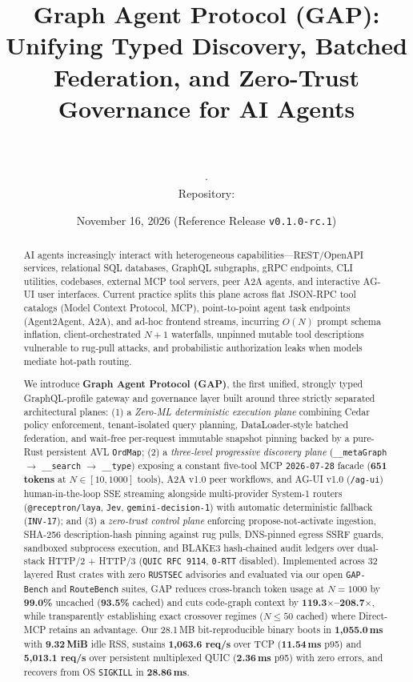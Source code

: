 \documentclass[10pt,twocolumn]{article}
\title{\Large\bfseries Graph Agent Protocol (GAP): Unifying Typed Discovery, Batched Federation, and Zero-Trust Governance for AI Agents}
\author{
  {\fontencoding{T5}\selectfont \GapAuthorFullName} \\
  \small \GapAuthorAffiliation \\
  \small \texttt{\GapAuthorEmail} \quad $\cdot$ \quad {\scriptsize \href{\GapAuthorOrcid}{\texttt{\GapAuthorOrcid}}} \\
  \small Repository: \href{\GapRepoUrl}{\texttt{\GapRepoUrl}}
}
\date{November 16, 2026 \quad (Reference Release \texttt{v0.1.0-rc.1})}
\begin{document}
\maketitle

\begin{abstract}
AI agents increasingly interact with heterogeneous capabilities—REST/OpenAPI services, relational SQL databases, GraphQL subgraphs, gRPC endpoints, CLI utilities, codebases, external MCP tool servers, peer A2A agents, and interactive AG-UI user interfaces. Current practice splits this plane across flat JSON-RPC tool catalogs (Model Context Protocol, MCP), point-to-point agent task endpoints (Agent2Agent, A2A), and ad-hoc frontend streams, incurring $O(N)$ prompt schema inflation, client-orchestrated $N+1$ waterfalls, unpinned mutable tool descriptions vulnerable to rug-pull attacks, and probabilistic authorization leaks when models mediate hot-path routing.

We introduce \textbf{Graph Agent Protocol (GAP)}, the first unified, strongly typed GraphQL-profile gateway and governance layer built around three strictly separated architectural planes: (1) a \emph{Zero-ML deterministic execution plane} combining Cedar policy enforcement, tenant-isolated query planning, DataLoader-style batched federation, and wait-free per-request immutable snapshot pinning backed by a pure-Rust persistent AVL \texttt{OrdMap}; (2) a \emph{three-level progressive discovery plane} (\texttt{\_\_metaGraph} $\rightarrow$ \texttt{\_\_search} $\rightarrow$ \texttt{\_\_type}) exposing a constant five-tool MCP \texttt{2026-07-28} facade (\textbf{651 tokens} at $N \in [10, 1000]$ tools), A2A v1.0 peer workflows, and AG-UI v1.0 (\texttt{/ag-ui}) human-in-the-loop SSE streaming alongside multi-provider System-1 routers (\texttt{@receptron/laya}, \texttt{Jev}, \texttt{gemini-decision-1}) with automatic deterministic fallback (\texttt{INV-17}); and (3) a \emph{zero-trust control plane} enforcing propose-not-activate ingestion, SHA-256 description-hash pinning against rug pulls, DNS-pinned egress SSRF guards, sandboxed subprocess execution, and BLAKE3 hash-chained audit ledgers over dual-stack HTTP/2 + HTTP/3 (\texttt{QUIC RFC 9114}, \texttt{0-RTT} disabled). Implemented across 32 layered Rust crates with zero \texttt{RUSTSEC} advisories and evaluated via our open \texttt{GAP-Bench} and \texttt{RouteBench} suites, GAP reduces cross-branch token usage at $N=1000$ by \textbf{99.0\%} uncached (\textbf{93.5\%} cached) and cuts code-graph context by \textbf{119.3$\times$--208.7$\times$}, while transparently establishing exact crossover regimes ($N \le 50$ cached) where Direct-MCP retains an advantage. Our 28.1\,MB bit-reproducible binary boots in \textbf{1,055.0\,ms} with \textbf{9.32\,MiB} idle RSS, sustains \textbf{1,063.6 req/s} over TCP (\textbf{11.54\,ms} p95) and \textbf{5,013.1 req/s} over persistent multiplexed QUIC (\textbf{2.36\,ms} p95) with zero errors, and recovers from OS \texttt{SIGKILL} in \textbf{28.86\,ms}.
\end{abstract}
\end{document}
